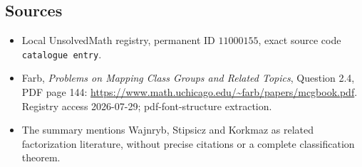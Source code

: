 \documentclass[11pt]{article}
\begin{document}
\subsection{Sources}
\begin{itemize}
\item Local UnsolvedMath registry, permanent ID \(11000155\), exact source code \texttt{catalogue entry}.
\item Farb, \emph{Problems on Mapping Class Groups and Related Topics}, Question 2.4, PDF page 144: \url{https://www.math.uchicago.edu/~farb/papers/mcgbook.pdf}. Registry access 2026-07-29; pdf-font-structure extraction.
\item The summary mentions Wajnryb, Stipsicz and Korkmaz as related factorization literature, without precise citations or a complete classification theorem.
\end{itemize}
\end{document}
